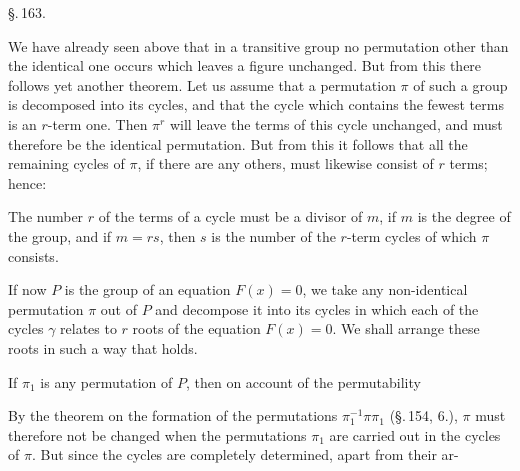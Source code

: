 \begin{center}
\S.\,163.

\end{center}

We have already seen above that in a transitive  group no permutation other than the identical one occurs which leaves a figure unchanged. But from this there follows yet another theorem. Let us assume that a permutation $\pi$ of such a group is decomposed into its cycles, and that the cycle which contains the fewest terms is an $r$-term one. Then $\pi^r$ will leave the terms of this cycle unchanged, and must therefore be the identical permutation. But from this it follows that all the remaining cycles of $\pi$, if there are any others, must likewise consist of $r$ terms; hence:


The number $r$ of the terms of a cycle must be a divisor of $m$, if $m$ is the degree of the group, and if $m=rs$, then $s$ is the number of the $r$-term cycles of which $\pi$ consists.

If now $P$ is the group of an  equation $F(x)=0$, we take any non-identical permutation $\pi$ out of $P$ and decompose it into its cycles
in which each of the cycles $\gamma$ relates to $r$ roots of the equation $F(x)=0$. We shall arrange these roots in such a way that
holds.

If $\pi_1$ is any permutation of $P$, then on account of the permutability

By the theorem on the formation of the permutations $\pi_1^{-1}\pi\pi_1$ (\S.\,154, 6.), $\pi$ must therefore not be changed when the permutations $\pi_1$ are carried out in the cycles of $\pi$. But since the cycles are completely determined, apart from their ar-
